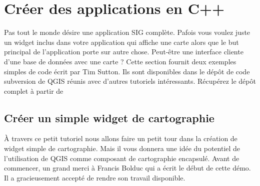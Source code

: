 \section{Cr\'eer des applications en C++}

Pas tout le monde d\'esire une application SIG compl\`ete. Pafois vous voulez juste
un widget inclus dans votre application qui affiche une carte alors que le but 
principal de l'application porte sur autre chose. Peut-\^etre une interface 
cliente d'une base de donn\'ees avec une carte ? Cette section fournit deux 
exemples simples de code \'ecrit par Tim Sutton. Ils sont disponibles dans le d\'ep\^ot
 de code subversion de QGIS r\'eunis avec d'autres tutoriels int\'eressants. 
 R\'ecup\'erez le d\'ep\^ot complet \`a partir de 

\subsection{Cr\'eer un simple widget de cartographie}\label{subsec:simple_widget}

\`A travers ce petit tutoriel nous allons faire un petit tour dans la cr\'eation de
widget simple de cartographie.
Mais il vous donnera une id\'ee du potentiel de l'utilisation de QGIS comme 
composant de cartographie encapsul\'e. Avant de commencer, un grand merci \`a 
Francis Bolduc qui a \'ecrit le d\'ebut de cette d\'emo. Il a gracieusement accept\'e de
rendre son travail disponible.

